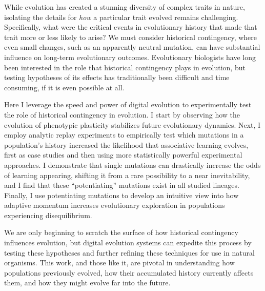 
While evolution has created a stunning diversity of complex traits in nature, isolating the details for \textit{how} a particular trait evolved remains challenging.
Specifically, what were the critical events in evolutionary history that made that trait more or less likely to arise? %
We must consider historical contingency, where even small changes, such as an apparently neutral mutation, can have substantial influence on long-term evolutionary outcomes. 
Evolutionary biologists have long been interested in the role that historical contingency plays in evolution, but testing hypotheses of its effects has traditionally been difficult and time consuming, if it is even possible at all. 

Here I leverage the speed and power of digital evolution to experimentally test the role of historical contingency in evolution. 
I start by observing how the evolution of phenotypic plasticity stabilizes future evolutionary dynamics. 
Next, I employ analytic replay experiments to empirically test which mutations in a population's history increased the likelihood that associative learning evolves, first as case studies and then using more statistically powerful experimental approaches. 
I demonstrate that single mutations can drastically increase the odds of learning appearing, shifting it from a rare possibility to a near inevitability, and I find that these ``potentiating'' mutations exist in all studied lineages. 
Finally, I use potentiating mutations to develop an intuitive view into how adaptive momentum increases evolutionary exploration in populations experiencing disequilibrium. 

We are only beginning to scratch the surface of how historical contingency influences evolution, but digital evolution systems can expedite this process by testing these hypotheses and further refining these techniques for use in natural organisms. 
This work, and those like it, are pivotal in understanding how populations previously evolved, how their accumulated history currently affects them, and how they might evolve far into the future.


